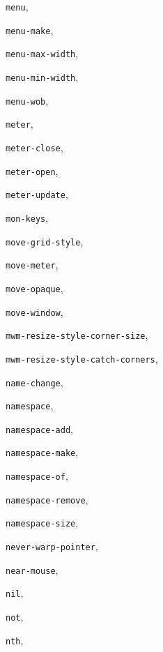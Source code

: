 \begin{theindex}
\item {\tt menu}, {\bf\pageref{menu}}
\item {\tt menu-make}, {\bf\pageref{menu-make}}
\item {\tt menu-max-width}, {\bf\pageref{menu-max-width}}
\item {\tt menu-min-width}, {\bf\pageref{menu-min-width}}
\item {\tt menu-wob}, {\bf\pageref{menu-wob}}
\item {\tt meter}, {\bf\pageref{meter}}
\item {\tt meter-close}, {\bf\pageref{meter-close}}
\item {\tt meter-open}, {\bf\pageref{meter-open}}
\item {\tt meter-update}, {\bf\pageref{meter-update}}
\item {\tt mon-keys}, {\bf\pageref{mon-keys}}
\item {\tt move-grid-style}, {\bf\pageref{move-grid-style}}
\item {\tt move-meter}, {\bf\pageref{move-meter}}
\item {\tt move-opaque}, {\bf\pageref{move-opaque}}
\item {\tt move-window}, {\bf\pageref{move-window}}
\item {\tt mwm-resize-style-corner-size}, {\bf\pageref{mwm-resize-style-corner-size}}
\item {\tt mwm-resize-style-catch-corners}, {\bf\pageref{mwm-resize-style-catch-corners}}
\item {\tt name-change}, {\bf\pageref{name-change}}
\item {\tt namespace}, {\bf\pageref{namespace}}
\item {\tt namespace-add}, {\bf\pageref{namespace-add}}
\item {\tt namespace-make}, {\bf\pageref{namespace-make}}
\item {\tt namespace-of}, {\bf\pageref{namespace-of}}
\item {\tt namespace-remove}, {\bf\pageref{namespace-remove}}
\item {\tt namespace-size}, {\bf\pageref{namespace-size}}
\item {\tt never-warp-pointer}, {\bf\pageref{never-warp-pointer}}
\item {\tt near-mouse}, {\bf\pageref{near-mouse.gwm}}
\item {\tt nil}, {\bf\pageref{nil}}
\item {\tt not}, {\bf\pageref{not}}
\item {\tt nth}, {\bf\pageref{nth}}

\end{theindex}
